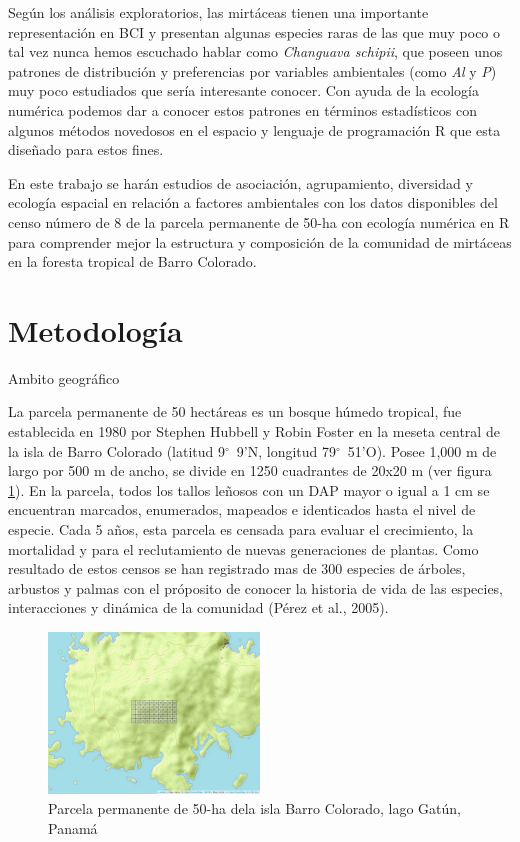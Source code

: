 \documentclass[11pt,]{article}
\begin{document}
Según los análisis exploratorios, las mirtáceas tienen una importante
representación en BCI y presentan algunas especies raras de las que muy
poco o tal vez nunca hemos escuchado hablar como \emph{Changuava
schipii}, que poseen unos patrones de distribución y preferencias por
variables ambientales (como \emph{Al} y \emph{P}) muy poco estudiados
que sería interesante conocer. Con ayuda de la ecología numérica podemos
dar a conocer estos patrones en términos estadísticos con algunos
métodos novedosos en el espacio y lenguaje de programación R que esta
diseñado para estos fines.

En este trabajo se harán estudios de asociación, agrupamiento,
diversidad y ecología espacial en relación a factores ambientales con
los datos disponibles del censo número de 8 de la parcela permanente de
50-ha con ecología numérica en R para comprender mejor la estructura y
composición de la comunidad de mirtáceas en la foresta tropical de Barro
Colorado.

\section{Metodología}\label{metodologuxeda}

Ambito geográfico

La parcela permanente de 50 hectáreas es un bosque húmedo tropical, fue
establecida en 1980 por Stephen Hubbell y Robin Foster en la meseta
central de la isla de Barro Colorado (latitud 9\(^\circ\)~9'N, longitud
79\(^\circ\)~51'O). Posee 1,000 m de largo por 500 m de ancho, se divide
en 1250 cuadrantes de 20x20 m (ver figura \ref{fig:mapa_cuadros_bci}).
En la parcela, todos los tallos leñosos con un DAP mayor o igual a 1 cm
se encuentran marcados, enumerados, mapeados e identicados hasta el
nivel de especie. Cada 5 años, esta parcela es censada para evaluar el
crecimiento, la mortalidad y para el reclutamiento de nuevas
generaciones de plantas. Como resultado de estos censos se han
registrado mas de 300 especies de árboles, arbustos y palmas con el
próposito de conocer la historia de vida de las especies, interacciones
y dinámica de la comunidad (Pérez et al., 2005).

\begin{figure}
\centering
\includegraphics[width=0.50000\textwidth]{mapa_cuadros.png}
\caption{Parcela permanente de 50-ha dela isla Barro Colorado, lago
Gatún, Panamá \label{fig:mapa_cuadros_bci}}
\end{figure}
\end{document}
